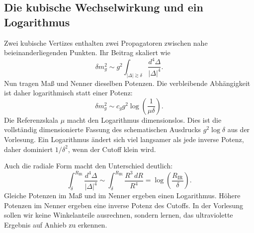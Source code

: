 \subsection{Die kubische Wechselwirkung und ein Logarithmus}

Zwei kubische Vertizes enthalten zwei Propagatoren zwischen nahe beieinanderliegenden Punkten. Ihr Beitrag skaliert wie \begin{equation}
\delta m_g^2
\sim
g^2\int_{|\Delta|\gtrsim\delta}
\frac{d^4\Delta}{|\Delta|^4}.
\label{eq:cubic-loop}
\end{equation}Nun tragen Maß und Nenner dieselben Potenzen. Die verbleibende Abhängigkeit ist daher logarithmisch statt einer Potenz: \begin{equation}
\delta m_g^2
\sim
c_g g^2\log\!\left(\frac{1}{\mu\delta}\right).
\label{eq:cubic-log}
\end{equation}Die Referenzskala \(\mu\) macht den Logarithmus dimensionslos. Dies ist die vollständig dimensionierte Fassung des schematischen Ausdrucks \(g^2\log\delta\) aus der Vorlesung. Ein Logarithmus ändert sich viel langsamer als jede inverse Potenz, daher dominiert \(1/\delta^2\), wenn der Cutoff klein wird.

Auch die radiale Form macht den Unterschied deutlich: \begin{equation}
\int_{\delta}^{R_{\mathrm{IR}}}
\frac{d^4\Delta}{|\Delta|^4}
\sim
\int_{\delta}^{R_{\mathrm{IR}}}\frac{R^3\,dR}{R^4}
=\log\!\left(\frac{R_{\mathrm{IR}}}{\delta}\right).
\end{equation}Gleiche Potenzen im Maß und im Nenner ergeben einen Logarithmus. Höhere Potenzen im Nenner ergeben eine inverse Potenz des Cutoffs. In der Vorlesung sollen wir keine Winkelanteile ausrechnen, sondern lernen, das ultraviolette Ergebnis auf Anhieb zu erkennen.

\begin{classroomqa}\end{classroomqa}

\begin{classroomqa}\end{classroomqa}

